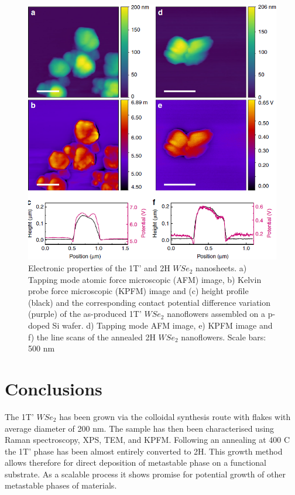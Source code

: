 \begin{figure}[!h]
	\begin{center}
		\includegraphics[scale=0.3]{1T'/ElectronicProperties.png}
		\caption{Electronic properties of the 1T’ and 2H $WSe_2$ nanosheets. a) Tapping mode atomic force microscopic (AFM) image, b) Kelvin probe force microscopic (KPFM) image and (c) height profile (black) and the corresponding contact potential difference variation (purple) of the as-produced 1T’ $WSe_2$ nanoflowers assembled on a p-doped Si wafer. d) Tapping mode AFM image, e) KPFM image and f) the line scans of the annealed 2H $WSe_2$ nanoflowers. Scale bars: 500 nm}
		\label{fig:1T'ElectronicProperties}
	\end{center}
\end{figure}

\section{Conclusions}

The 1T' $WSe_2$ has been grown via the colloidal synthesis route with flakes with average diameter of 200 nm. The sample has then been characterised using Raman spectroscopy, XPS, TEM, and KPFM. Following an annealing at 400 {\degree}C the 1T' phase has been almost entirely converted to 2H. This growth method allows therefore for direct deposition of metastable phase on a functional substrate. As a scalable process it shows promise for potential growth of other metastable phases of materials. 